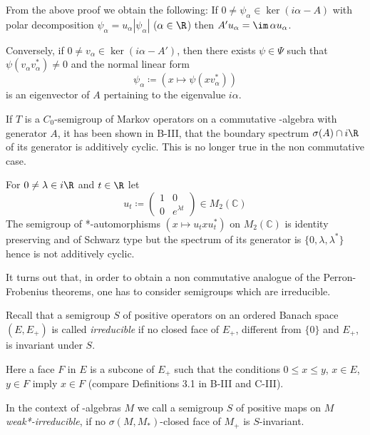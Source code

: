\begin{remark}\label{rem:d3-1.9}
From the above proof we obtain the following: If $0 \neq \psi_{\alpha} \in \ker(i\alpha - A)$ with polar decomposition $\psi_{\alpha} = u_{\alpha}|\psi_{\alpha}|$ ($\alpha \in \R$) then $A'u_{\alpha} = \im\,\alpha u_{\alpha}$.

Conversely, if $0 \neq v_{\alpha} \in \ker(i\alpha - A')$, then there exists $\psi \in \Psi$ such that $\psi(v_{\alpha}v_{\alpha}^{*}) \neq 0$ and the normal linear form
\[
\psi_{\alpha} \coloneqq (x \mapsto \psi(xv_{\alpha}^{*}))
\]
is an eigenvector of $A$ pertaining to the eigenvalue $i\alpha$.
\end{remark}

If $T$ is a $C_{0}$-semigroup of Markov operators on a commutative \CA-algebra with generator $A$, it has been shown in B-III, that the boundary spectrum $\sigma(A) \cap i\R$ of its generator is additively cyclic.
This is no longer true in the non commutative case.

\begin{example}\label{examp:counter}
For $0 \neq \lambda \in i\R$ and $t \in \R$ let
\[
u_{t} \coloneqq \begin{pmatrix} 1 & 0 \\ 0 & e^{\lambda t} \end{pmatrix} \in M_{2}(\mathbb{C})
\]
The semigroup of *-automorphisms $(x \mapsto u_{t}xu_{t}^{*})$ on $M_{2}(\mathbb{C})$ is identity preserving and of Schwarz type but the spectrum of its generator is $\{0, \lambda, \lambda^{*}\}$ hence is not additively cyclic.
\end{example}

\newpage


It turns out that, in order to obtain a non commutative analogue of the Perron-Frobenius theorems, one has to consider semigroups which are irreducible.

Recall that a semigroup $S$ of positive operators on an ordered Banach space $(E,E_{+})$ is called \emph{irreducible} if no closed face of $E_{+}$, different from $\{0\}$ and $E_{+}$, is invariant under $S$.

Here a face $F$ in $E$ is a subcone of $E_{+}$ such that the conditions $0 \leq x \leq y$, $x \in E$, $y \in F$ imply $x \in F$ (compare Definitions 3.1 in B-III and C-III).

In the context of \WA-algebras $M$ we call a semigroup $S$ of positive maps on $M$ \emph{weak*-irreducible}, if no $\sigma(M,M_{*})$-closed face of $M_{+}$ is $S$-invariant.

